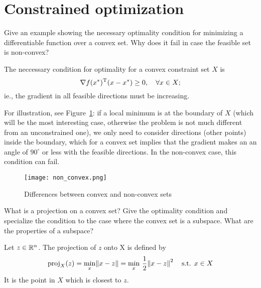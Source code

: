 \documentclass{article}
\begin{document}
\section{Constrained optimization}

\begin{question}
  Give an example showing the necessary optimality condition for minimizing a differentiable
  function over a convex set. Why does it fail in case the feasible set is non-convex?
\end{question}

The neccessary condition for optimality for a convex constraint set \(X\) is
\begin{equation*}
  \nabla f(x^*)^{\mathrm{T}}(x - x^*) \geq 0, \quad\forall x \in X;
\end{equation*}
ie., the gradient in all feasible directions must be increasing. 

For illustration, see Figure~\ref{fig:non-convex}: if a local minimum is at the boundary of \(X\) (which
will be the most interesting case, otherwise the problem is not much different from an unconstrained
one), we only need to consider directions (other points) inside the boundary, which for a convex set
implies that the gradient makes an an angle of \(90^\circ\) or less with the feasible directions.
In the non-convex case, this condition can fail.

\begin{figure}[H]
  \centering
  \texttt{[image: non\_convex.png]}
  \caption{Differences between convex and non-convex sets\label{fig:non-convex}}
\end{figure}

\begin{question}
  What is a projection on a convex set? Give the optimality condition and specialize the condition
  to the case where the convex set is a subspace.  What are the properties of a subspace?
\end{question}

Let \(z \in \mathbb{R}^n\).  The projection of \(z\) onto X is defined by
\begin{equation*}
  \proj_X(z) = \min_x \enVert{x - z}
  = \min_{x}\, \frac{1}{2}\enVert{x - z}^2 \quad\text{s.t. } x \in X
\end{equation*}
It is the point in \(X\) which is closest to \(z\). 
\end{document}
